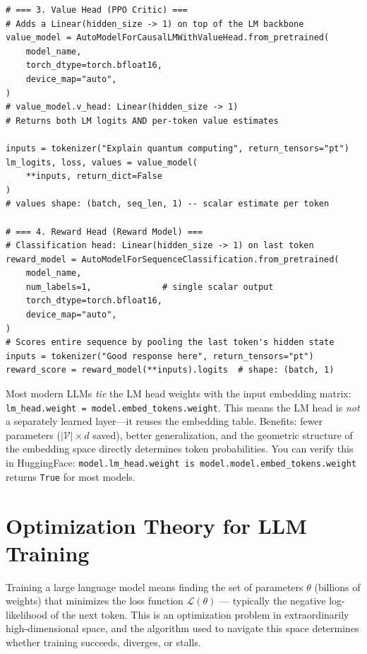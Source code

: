 \begin{lstlisting}[style=pythonstyle, caption={Loading and using different prediction heads with HuggingFace.}]
# === 3. Value Head (PPO Critic) ===
# Adds a Linear(hidden_size -> 1) on top of the LM backbone
value_model = AutoModelForCausalLMWithValueHead.from_pretrained(
    model_name,
    torch_dtype=torch.bfloat16,
    device_map="auto",
)
# value_model.v_head: Linear(hidden_size -> 1)
# Returns both LM logits AND per-token value estimates

inputs = tokenizer("Explain quantum computing", return_tensors="pt")
lm_logits, loss, values = value_model(
    **inputs, return_dict=False
)
# values shape: (batch, seq_len, 1) -- scalar estimate per token

# === 4. Reward Head (Reward Model) ===
# Classification head: Linear(hidden_size -> 1) on last token
reward_model = AutoModelForSequenceClassification.from_pretrained(
    model_name,
    num_labels=1,              # single scalar output
    torch_dtype=torch.bfloat16,
    device_map="auto",
)
# Scores entire sequence by pooling the last token's hidden state
inputs = tokenizer("Good response here", return_tensors="pt")
reward_score = reward_model(**inputs).logits  # shape: (batch, 1)
\end{lstlisting}

\begin{intuitionbox}[Weight Tying: LM Head = Embedding Matrix Transposed]
Most modern LLMs \emph{tie} the LM head weights with the input embedding matrix: \texttt{lm\_head.weight = model.embed\_tokens.weight}. This means the LM head is \emph{not} a separately learned layer---it reuses the embedding table. Benefits: fewer parameters ($|\mathcal{V}| \times d$ saved), better generalization, and the geometric structure of the embedding space directly determines token probabilities. You can verify this in HuggingFace: \texttt{model.lm\_head.weight is model.model.embed\_tokens.weight} returns \texttt{True} for most models.
\end{intuitionbox}

\newpage
\section{Optimization Theory for LLM Training}
\label{optimization-theory-for-llm-training}

Training a large language model means finding the set of parameters $\theta$ (billions of weights) that minimizes the loss function $\mathcal{L}(\theta)$ --- typically the negative log-likelihood of the next token. This is an optimization problem in extraordinarily high-dimensional space, and the algorithm used to navigate this space determines whether training succeeds, diverges, or stalls.

